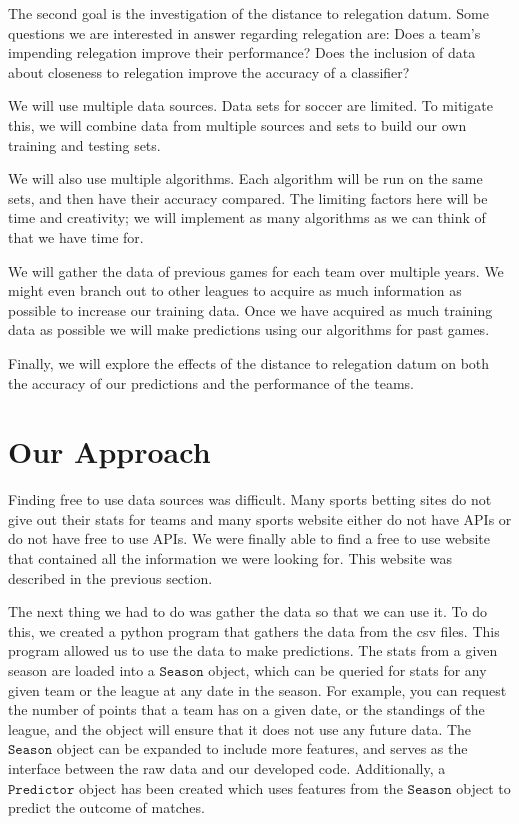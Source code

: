 \documentclass[conference]{IEEEtran}
\begin{document}
The second goal is the investigation of the distance to relegation datum. Some questions we are interested in answer regarding relegation are:
Does a team's impending relegation improve their performance?
Does the inclusion of data about closeness to relegation improve the accuracy of a classifier?

We will use multiple data sources. Data sets for soccer are limited. To mitigate this, we will combine data from multiple sources and sets to build our own training and testing sets.

We will also use multiple algorithms. Each algorithm will be run on the same sets, and then have their accuracy compared.  The limiting factors here will be time and creativity; we will implement as many algorithms as we can think of that we have time for.

We will gather the data of previous games for each team over multiple years. We might even branch out to other leagues to acquire as much information as possible to increase our training data. Once we have acquired as much training data as possible we will make predictions using our algorithms for past games.

Finally, we will explore the effects of the distance to relegation datum on both the accuracy of our predictions and the performance of the teams.
\section{Our Approach}
Finding free to use data sources was difficult. Many sports betting sites do not give out their stats for teams and many sports website either do not have APIs or do not have free to use APIs. We were finally able to find a free to use website that contained all the information we were looking for. This website was described in the previous section.

The next thing we had to do was gather the data so that we can use it. To do this, we created a python program that gathers the data from the csv files. This program allowed us to use the data to make predictions. The stats from a given season are loaded into a $\mathtt{Season}$ object, which can be queried for stats for any given team or the league at any date in the season. For example, you can request the number of points that a team has on a given date, or the standings of the league, and the object will ensure that it does not use any future data. The $\mathtt{Season}$ object can be expanded to include more features, and serves as the interface between the raw data and our developed code. Additionally, a $\mathtt{Predictor}$ object has been created which uses features from the $\mathtt{Season}$ object to predict the outcome of matches.
\end{document}
